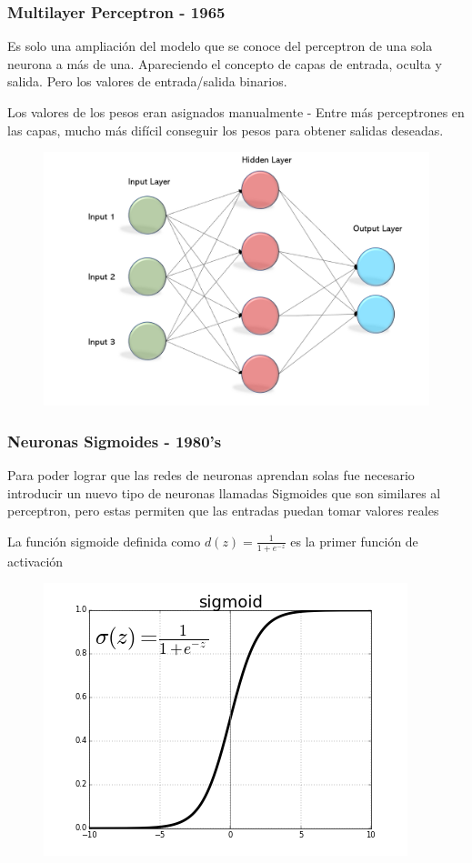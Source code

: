 \documentclass[
	11pt, %
]{beamer}
\begin{document}
\begin{frame}
  \frametitle{Multilayer Perceptron - 1965}

  Es solo una ampliación del modelo que se conoce del perceptron de una sola neurona a más de una. Apareciendo el concepto de capas de entrada, oculta y salida. Pero los valores de entrada/salida binarios.

  \bigskip %

  Los valores de los pesos eran asignados manualmente - Entre más perceptrones en las capas, mucho más difícil conseguir los pesos para obtener salidas deseadas.
  
\end{frame}

\begin{frame}
  
  \begin{figure}
    \includegraphics[width=0.8\linewidth]{m_perceptron.png}
  \end{figure}
\end{frame}

\begin{frame}
  \frametitle{Neuronas Sigmoides - 1980's}

  Para poder lograr que las redes de neuronas aprendan solas fue necesario introducir un nuevo tipo de neuronas llamadas \alert{Sigmoides} que son similares al perceptron, pero estas permiten que las entradas puedan tomar valores reales

  \bigskip %

  La función sigmoide definida como $d(z) = \frac{1}{1+e^{-z}}$ es la primer función de activación

  \begin{figure}
    \includegraphics[width=0.5\linewidth]{sigmoid.png}
  \end{figure}
  
\end{frame}
\end{document}
